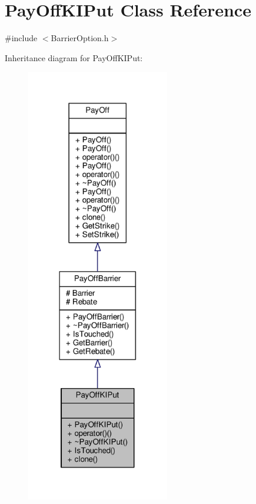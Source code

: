 \hypertarget{classPayOffKIPut}{}\section{Pay\+Off\+K\+I\+Put Class Reference}
\label{classPayOffKIPut}


{\ttfamily \#include $<$Barrier\+Option.\+h$>$}



Inheritance diagram for Pay\+Off\+K\+I\+Put\+:
\nopagebreak
\begin{figure}[H]
\begin{center}
\leavevmode
\includegraphics[width=177pt]{classPayOffKIPut__inherit__graph}
\end{center}
\end{figure}


